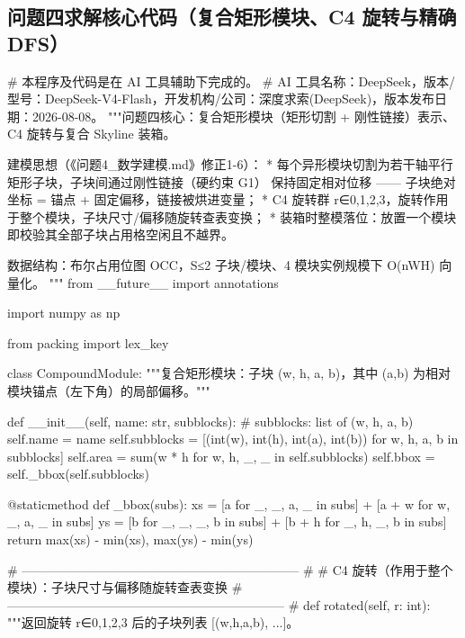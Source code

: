 \documentclass{JXUSTmodeling}
\begin{document}
\begin{appendixx}
  \section{问题四求解核心代码（复合矩形模块、C4 旋转与精确 DFS）}
  \begin{python}
# 本程序及代码是在 AI 工具辅助下完成的。
# AI 工具名称：DeepSeek，版本/型号：DeepSeek-V4-Flash，开发机构/公司：深度求索(DeepSeek)，版本发布日期：2026-08-08。
"""问题四核心：复合矩形模块（矩形切割 + 刚性链接）表示、C4 旋转与复合 Skyline 装箱。

建模思想（《问题4_数学建模.md》修正1-6）：
  * 每个异形模块切割为若干轴平行矩形子块，子块间通过刚性链接（硬约束 G1）
    保持固定相对位移 —— 子块绝对坐标 = 锚点 + 固定偏移，链接被烘进变量；
  * C4 旋转群 r∈{0,1,2,3}，旋转作用于整个模块，子块尺寸/偏移随旋转查表变换；
  * 装箱时整模落位：放置一个模块即校验其全部子块占用格空闲且不越界。

数据结构：布尔占用位图 OCC，S≤2 子块/模块、4 模块实例规模下 O(nWH) 向量化。
"""
from __future__ import annotations

import numpy as np

from packing import lex_key


class CompoundModule:
    """复合矩形模块：子块 (w, h, a, b)，其中 (a,b) 为相对模块锚点（左下角）的局部偏移。"""

    def __init__(self, name: str, subblocks):
        # subblocks: list of (w, h, a, b)
        self.name = name
        self.subblocks = [(int(w), int(h), int(a), int(b)) for w, h, a, b in subblocks]
        self.area = sum(w * h for w, h, _, _ in self.subblocks)
        self.bbox = self._bbox(self.subblocks)

    @staticmethod
    def _bbox(subs):
        xs = [a for _, _, a, _ in subs] + [a + w for w, _, a, _ in subs]
        ys = [b for _, _, _, b in subs] + [b + h for _, h, _, b in subs]
        return max(xs) - min(xs), max(ys) - min(ys)

    # ------------------------------------------------------------------ #
    # C4 旋转（作用于整个模块）：子块尺寸与偏移随旋转查表变换
    # ------------------------------------------------------------------ #
    def rotated(self, r: int):
        """返回旋转 r∈{0,1,2,3} 后的子块列表 [(w,h,a,b), ...]。


\end{python}
\end{appendixx}
\end{document}
